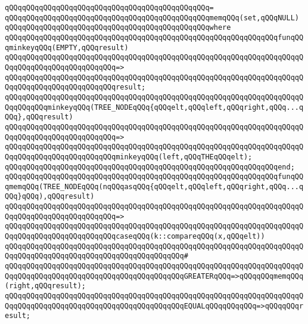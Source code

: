 \verb|qQQqqQQqqQQqqQQqqQQqqQQqqQQqqQQqqQQqqQQqqQQqqQQq=|\newline
\verb|qQQqqQQqqQQqqQQqqQQqqQQqqQQqqQQqqQQqqQQqqQQqqQQqmemqQQq(set,qQQqNULL)|\newline
\verb|qQQqqQQqqQQqqQQqqQQqqQQqqQQqqQQqqQQqqQQqqQQqqQQqwhere|\newline
\verb|qQQqqQQqqQQqqQQqqQQqqQQqqQQqqQQqqQQqqQQqqQQqqQQqqQQqqQQqqQQqqQQqfunqQQqminkeyqQQq(EMPTY,qQQqresult)|\newline
\verb|qQQqqQQqqQQqqQQqqQQqqQQqqQQqqQQqqQQqqQQqqQQqqQQqqQQqqQQqqQQqqQQqqQQqqQQqqQQqqQQqqQQqqQQqqQQqqQQq=>|\newline
\verb|qQQqqQQqqQQqqQQqqQQqqQQqqQQqqQQqqQQqqQQqqQQqqQQqqQQqqQQqqQQqqQQqqQQqqQQqqQQqqQQqqQQqqQQqqQQqqQQqresult;|\newline
\newline
\verb|qQQqqQQqqQQqqQQqqQQqqQQqqQQqqQQqqQQqqQQqqQQqqQQqqQQqqQQqqQQqqQQqqQQqqQQqqQQqqQQqminkeyqQQq(TREE_NODEqQQq{qQQqelt,qQQqleft,qQQqright,qQQq...qQQq},qQQqresult)|\newline
\verb|qQQqqQQqqQQqqQQqqQQqqQQqqQQqqQQqqQQqqQQqqQQqqQQqqQQqqQQqqQQqqQQqqQQqqQQqqQQqqQQqqQQqqQQqqQQqqQQq=>|\newline
\verb|qQQqqQQqqQQqqQQqqQQqqQQqqQQqqQQqqQQqqQQqqQQqqQQqqQQqqQQqqQQqqQQqqQQqqQQqqQQqqQQqqQQqqQQqqQQqqQQqminkeyqQQq(left,qQQqTHEqQQqelt);|\newline
\verb|qQQqqQQqqQQqqQQqqQQqqQQqqQQqqQQqqQQqqQQqqQQqqQQqqQQqqQQqqQQqqQQqend;|\newline
\newline
\verb|qQQqqQQqqQQqqQQqqQQqqQQqqQQqqQQqqQQqqQQqqQQqqQQqqQQqqQQqqQQqqQQqfunqQQqmemqQQq(TREE_NODEqQQq(nqQQqasqQQq{qQQqelt,qQQqleft,qQQqright,qQQq...qQQq}qQQq),qQQqresult)|\newline
\verb|qQQqqQQqqQQqqQQqqQQqqQQqqQQqqQQqqQQqqQQqqQQqqQQqqQQqqQQqqQQqqQQqqQQqqQQqqQQqqQQqqQQqqQQqqQQqqQQq=>|\newline
\verb|qQQqqQQqqQQqqQQqqQQqqQQqqQQqqQQqqQQqqQQqqQQqqQQqqQQqqQQqqQQqqQQqqQQqqQQqqQQqqQQqqQQqqQQqqQQqqQQqcaseqQQq(k::compareqQQq(x,qQQqelt))|\newline
\verb|qQQqqQQqqQQqqQQqqQQqqQQqqQQqqQQqqQQqqQQqqQQqqQQqqQQqqQQqqQQqqQQqqQQqqQQqqQQqqQQqqQQqqQQqqQQqqQQqqQQqqQQqqQQqqQQq#|\newline
\verb|qQQqqQQqqQQqqQQqqQQqqQQqqQQqqQQqqQQqqQQqqQQqqQQqqQQqqQQqqQQqqQQqqQQqqQQqqQQqqQQqqQQqqQQqqQQqqQQqqQQqqQQqqQQqqQQqGREATERqQQq=>qQQqqQQqmemqQQq(right,qQQqresult);|\newline
\verb|qQQqqQQqqQQqqQQqqQQqqQQqqQQqqQQqqQQqqQQqqQQqqQQqqQQqqQQqqQQqqQQqqQQqqQQqqQQqqQQqqQQqqQQqqQQqqQQqqQQqqQQqqQQqqQQqEQUALqQQqqQQqqQQq=>qQQqqQQqresult;|\newline
